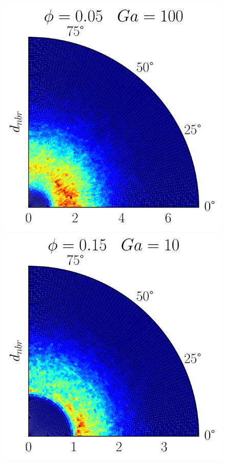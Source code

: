 \begin{figure}[h!]
    \includegraphics[height =\size]{image/N_10/beta/2DMAP_theta_distmin_dmin_10_Bo1PHI0_05mu_r0_42Ga100.pdf}
    \includegraphics[height =\size]{image/N_10/beta/2DMAP_theta_distmin_dmin_10_Bo1PHI0_15mu_r0_42Ga10.pdf}

\end{figure}
